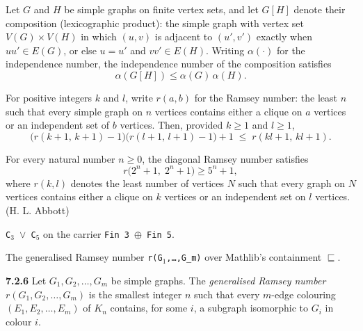 \begin{theorem}
\label{SimpleGraph.indepNum_composition_le}
Let $G$ and $H$ be simple graphs on finite vertex sets, and let $G[H]$ denote their
composition (lexicographic product): the simple graph with vertex set $V(G) \times V(H)$
in which $(u,v)$ is adjacent to $(u',v')$ exactly when $uu' \in E(G)$, or else $u = u'$
and $vv' \in E(H)$. Writing $\alpha(\cdot)$ for the independence number, the
independence number of the composition satisfies \[ \alpha(G[H]) \le
\alpha(G)\,\alpha(H). \]
\end{theorem}

\begin{theorem}
\label{SimpleGraph.ramsey_product_lower}
For positive integers $k$ and $l$, write $r(a,b)$ for the Ramsey number: the least $n$
such that every simple graph on $n$ vertices contains either a clique on $a$ vertices or
an independent set of $b$ vertices. Then, provided $k \ge 1$ and $l \ge 1$,
\[
\bigl(r(k+1,\,k+1) - 1\bigr)\bigl(r(l+1,\,l+1) - 1\bigr) + 1 \;\le\; r(kl+1,\,kl+1).
\]
\end{theorem}

\begin{theorem}
\label{SimpleGraph.abbott_lower_bound}
For every natural number $n \ge 0$, the diagonal Ramsey number satisfies
\[
  r\bigl(2^n + 1,\; 2^n + 1\bigr) \ge 5^n + 1,
\]
where $r(k, l)$ denotes the least number of vertices $N$ such that every graph on $N$
vertices contains either a clique on $k$ vertices or an independent set on $l$ vertices.
(H. L. Abbott)
\end{theorem}

\begin{definition}
\label{SimpleGraph.grahamGraph}
\leanok
{}
\texttt{C$_{3}$ $\lor$ C$_{5}$} on the carrier \texttt{Fin 3 $\oplus$ Fin 5}.
\end{definition}

\begin{definition}
\label{SimpleGraph.generalisedRamseyNumber}
\leanok
The generalised Ramsey number \texttt{r(G$_{1}$,\dots{},G\_m)} over Mathlib's
containment \texttt{$\sqsubseteq$}.

\textbf{7.2.6} Let $G_1, G_2, \ldots, G_m$ be simple graphs. The \emph{generalised
Ramsey number} $r(G_1, G_2, \ldots, G_m)$ is the smallest integer $n$ such that every
$m$-edge colouring $(E_1, E_2, \ldots, E_m)$ of $K_n$ contains, for some $i$, a subgraph
isomorphic to $G_i$ in colour $i$.
\end{definition}

